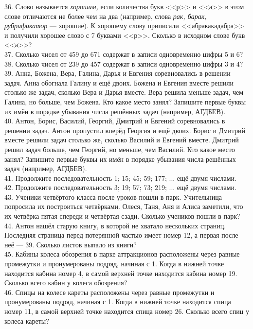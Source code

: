 36. Слово называется {\it хорошим,} если количества букв <<р>> и <<а>> в этом слове отличаются не более чем на два (например, слова {\it рак, барак, рубрификатор} --- хорошие). К хорошему слову приписали <<абракакадабра>> и получили хорошее слово с 7 буквами <<р>>. Сколько в исходном слове букв <<а>>?\\
37. Сколько чисел от 459 до 671 содержат в записи одновременно цифры 5 и 6?\\
38. Сколько чисел от 239 до 457 содержат в записи одновременно цифры 3 и 4?\\
39. Анна, Божена, Вера, Галина, Дарья и Евгения соревновались в решении задач. Анна обогнала Галину и ещё двоих. Божена и Евгения вместе решили столько же задач, сколько Вера и Дарья вместе. Вера решила меньше задач, чем Галина, но больше, чем Божена. Кто какое место занял? Запишите первые буквы их имён в порядке убывания числа решённых задач (например, АГДБЕВ).\\
40. Антон, Борис, Василий, Георгий, Дмитрий и Евгений соревновались в решении задач. Антон пропустил вперёд Георгия и ещё двоих. Борис и Дмитрий вместе решили задач столько же, сколько Василий и Евгений вместе. Дмитрий решил задач больше, чем Георгий, но меньше, чем Василий. Кто какое место занял? Запишите первые буквы их имён в порядке убывания числа решённых задач (например, АГДБЕВ).\\
41. Продолжите последовательность 1; 15; 45; 59; 177; ... ещё двумя числами.\\
42. Продолжите последовательность 3; 19; 57; 73; 219; ... ещё двумя числами.\\
43. Ученики четвёртого класса после уроков пошли в парк. Учительница попросила их построиться четвёрками. Олеся, Таня, Аня и Алиса заметили, что их четвёрка пятая спереди и четвёртая сзади. Сколько учеников пошли в парк?\\
44. Антон нашёл старую книгу, в которой не хватало нескольких страниц. Последняя страница перед потерянной частью имеет номер 12, а первая после неё --- 39. Сколько листов выпало из книги?\\
45. Кабины колеса обозрения в парке аттракционов расположены через равные промежутки и пронумерованы подряд, начиная с 1. Когда в нижней точке находится кабина номер 4, в самой верхней точке находится кабина номер 19. Сколько всего кабин у колеса обозрения?\\
46. Спицы на колесе кареты расположены через равные промежутки и пронумерованы подряд, начиная с 1. Когда в нижней точке находится спица номер 11, в самой верхней точке находится спица номер 26. Сколько всего спиц у колеса кареты?\\
